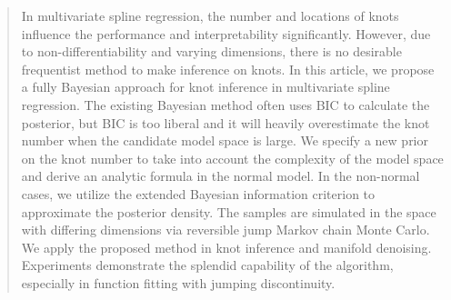 \begin{abstract}
In multivariate spline regression, the number and locations of knots influence the performance and interpretability significantly. However, due to non-differentiability and varying dimensions, there is no desirable frequentist method to make inference on knots. In this article, we propose a fully Bayesian approach for knot inference in multivariate spline regression. The existing Bayesian method often uses BIC to calculate the posterior, but BIC is too liberal and it will heavily overestimate the knot number when the candidate model space is large. We specify a new prior on the knot number to take into account the complexity of the model space and derive an analytic formula in the normal model. In the non-normal cases, we utilize the extended Bayesian information criterion to approximate the posterior density. The samples are simulated in the space with differing dimensions via reversible jump Markov chain Monte Carlo. We apply the proposed method in knot inference and manifold denoising. Experiments demonstrate the splendid capability of the algorithm, especially in function fitting with jumping discontinuity.
\end{abstract}
